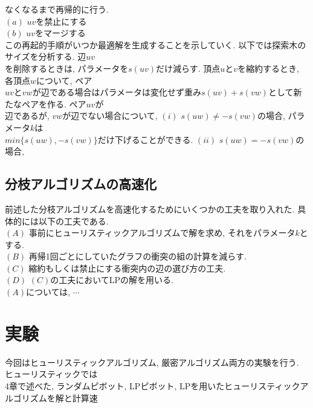 \documentclass[10.5,a4paper,titlepage]{bxjsarticle}
\begin{document}
なくなるまで再帰的に行う.\\

$(a)$ $uv$を禁止にする\\

$(b)$ $uv$をマージする\\

この再起的手順がいつか最適解を生成することを示していく. 以下では探索木のサイズを分析する.
辺$uv$\\

を削除するときは, パラメータを$s(uv)$だけ減らす.
頂点$u$と$v$を縮約するとき, 各頂点$w$について, ペア\\

$uv$と$vw$が辺である場合はパラメータは変化せず重み$s(uv)+s(vw)$として新たなペアを作る.
ペア$uv$が\\

辺であるが, $vw$が辺でない場合について, $(i)$ $s(uw) \neq -s(vw)$の場合, パラメータ$k$は\\

$min\{s(uw), -s(vw)\}$だけ下げることができる.
$(ii)$ $s(uw) = -s(vw)$の場合,
\subsection{分枝アルゴリズムの高速化}
前述した分枝アルゴリズムを高速化するためにいくつかの工夫を取り入れた. 具体的には以下の工夫である.\\

$(A)$ 事前にヒューリスティックアルゴリズムで解を求め, それをパラメータ$k$とする. \\

$(B)$ 再帰1回ごとにしていたグラフの衝突の組の計算を減らす. \\

$(C)$ 縮約もしくは禁止にする衝突内の辺の選び方の工夫. \\

$(D)$ $(C)$の工夫においてLPの解を用いる. \\

$(A)$については, $\cdots$\\
\section{実験}
今回はヒューリスティックアルゴリズム, 厳密アルゴリズム両方の実験を行う. ヒューリスティックでは\\

4章で述べた, ランダムピボット, LPピボット, LPを用いたヒューリスティックアルゴリズムを解と計算速\\
\end{document}
